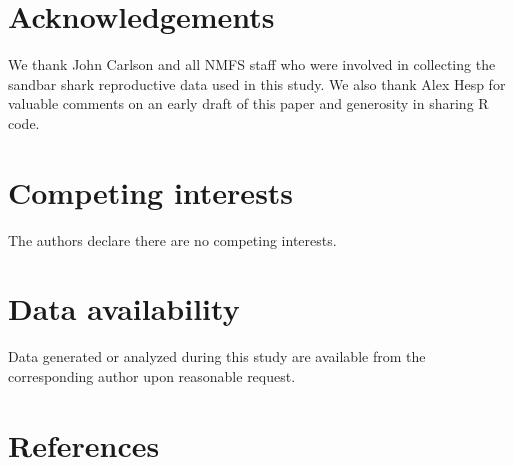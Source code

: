 \documentclass[
]{article}
\begin{document}
\section{Acknowledgements}\label{acknowledgements}

We thank John Carlson and all NMFS staff who were involved in collecting the sandbar shark reproductive data used in this study. We also thank Alex Hesp for valuable comments on an early draft of this paper and generosity in sharing R code.

\section{Competing interests}\label{competing-interests}

The authors declare there are no competing interests.

\section{Data availability}\label{data-availability}

Data generated or analyzed during this study are available from the corresponding author upon reasonable request.

\section*{References}\label{references}
\end{document}
